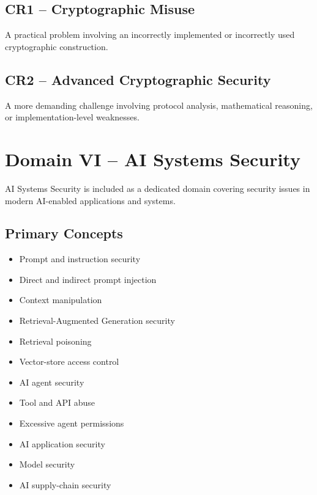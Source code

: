 \documentclass[11pt,a4paper]{article}
\begin{document}
\subsection{CR1 -- Cryptographic Misuse}

A practical problem involving an incorrectly implemented or incorrectly
used cryptographic construction.


\subsection{CR2 -- Advanced Cryptographic Security}

A more demanding challenge involving protocol analysis, mathematical
reasoning, or implementation-level weaknesses.



\section{Domain VI -- AI Systems Security}

AI Systems Security is included as a dedicated domain covering
security issues in modern AI-enabled applications and systems.


\subsection{Primary Concepts}

\begin{itemize}

    \item Prompt and instruction security
    \item Direct and indirect prompt injection
    \item Context manipulation
    \item Retrieval-Augmented Generation security
    \item Retrieval poisoning
    \item Vector-store access control
    \item AI agent security
    \item Tool and API abuse
    \item Excessive agent permissions
    \item AI application security
    \item Model security
    \item AI supply-chain security

\end{itemize}
\end{document}
